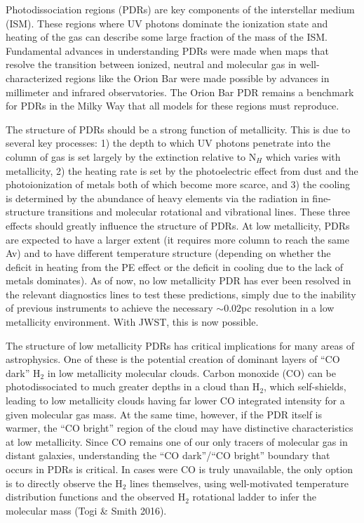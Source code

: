 \documentclass[12pt]{article}
\begin{document}
%
%
\justification          %
 Photodissociation regions (PDRs) are key components of the interstellar medium (ISM).  These regions where UV photons dominate the ionization state and heating of the gas can describe some large fraction of the mass of the ISM.  Fundamental advances in understanding PDRs were made when maps that resolve the transition between ionized, neutral and molecular gas in well-characterized regions like the Orion Bar were made possible by advances in millimeter and infrared observatories.  The Orion Bar PDR remains a benchmark for PDRs in the Milky Way that all models for these regions must reproduce.

The structure of PDRs should be a strong function of metallicity. This is due to several key processes: 1) the depth to which UV photons penetrate into the column of gas is set largely by the extinction relative to N$_H$ which varies with metallicity, 2) the heating rate is set by the photoelectric effect from dust and the photoionization of metals both of which become more scarce, and 3) the cooling is determined by the abundance of heavy elements via the radiation in fine-structure transitions and molecular rotational and vibrational lines.  These three effects should greatly influence the structure of PDRs.  At low metallicity, PDRs are expected to have a larger extent (it requires more column to reach the same Av) and to have different temperature structure (depending on whether the deficit in heating from the PE effect or the deficit in cooling due to the lack of metals dominates).  As of now, no low metallicity PDR has ever been resolved in the relevant diagnostics lines to test these predictions, simply due to the inability of previous instruments to achieve the necessary $\sim0.02$pc resolution in a low metallicity environment.  With JWST, this is now possible.

The structure of low metallicity PDRs has critical implications for many areas of astrophysics. One of these is the potential creation of dominant layers of ``CO dark'' H$_2$ in low metallicity molecular clouds.  Carbon monoxide (CO) can be photodissociated to much greater depths in a cloud than H$_2$, which self-shields, leading to low metallicity clouds having far lower CO integrated intensity for a given molecular gas mass. At the same time, however, if the PDR itself is warmer, the ``CO bright'' region of the cloud may have distinctive characteristics at low metallicity.  Since CO remains one of our only tracers of molecular gas in distant galaxies, understanding the ``CO dark''/``CO bright'' boundary that occurs in PDRs is critical.  In cases were CO is truly unavailable, the only option is to directly observe the H$_2$ lines themselves, using well-motivated temperature distribution functions and the observed H$_2$ rotational ladder to infer the molecular mass (Togi \& Smith 2016).
\end{document}
